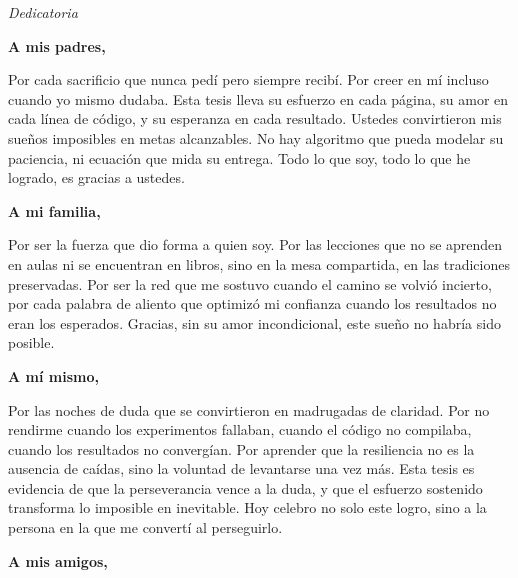 
\thispagestyle{empty}
\vspace*{\fill}

\begin{center}
\Large\textit{Dedicatoria}
\end{center}

\vspace{1cm}

\noindent
\textbf{A mis padres,}

\noindent
Por cada sacrificio que nunca pedí pero siempre recibí. Por creer en mí incluso cuando yo mismo dudaba. Esta tesis lleva su esfuerzo en cada página, su amor en cada línea de código, y su esperanza en cada resultado. Ustedes convirtieron mis sueños imposibles en metas alcanzables. No hay algoritmo que pueda modelar su paciencia, ni ecuación que mida su entrega. Todo lo que soy, todo lo que he logrado, es gracias a ustedes.

\vspace{0.8cm}

\noindent
\textbf{A mi familia,}

\noindent
Por ser la fuerza que dio forma a quien soy. Por las lecciones que no se aprenden en aulas ni se encuentran en libros, sino en la mesa compartida, en las tradiciones preservadas. Por ser la red que me sostuvo cuando el camino se volvió incierto, por cada palabra de aliento que optimizó mi confianza cuando los resultados no eran los esperados. Gracias, sin su amor incondicional, este sueño no habría sido posible.
\vspace{0.8cm}

\noindent
\textbf{A mí mismo,}

\noindent
Por las noches de duda que se convirtieron en madrugadas de claridad. Por no rendirme cuando los experimentos fallaban, cuando el código no compilaba, cuando los resultados no convergían. Por aprender que la resiliencia no es la ausencia de caídas, sino la voluntad de levantarse una vez más. Esta tesis es evidencia de que la perseverancia vence a la duda, y que el esfuerzo sostenido transforma lo imposible en inevitable. Hoy celebro no solo este logro, sino a la persona en la que me convertí al perseguirlo.

\vspace{0.8cm}

\noindent
\textbf{A mis amigos,}

